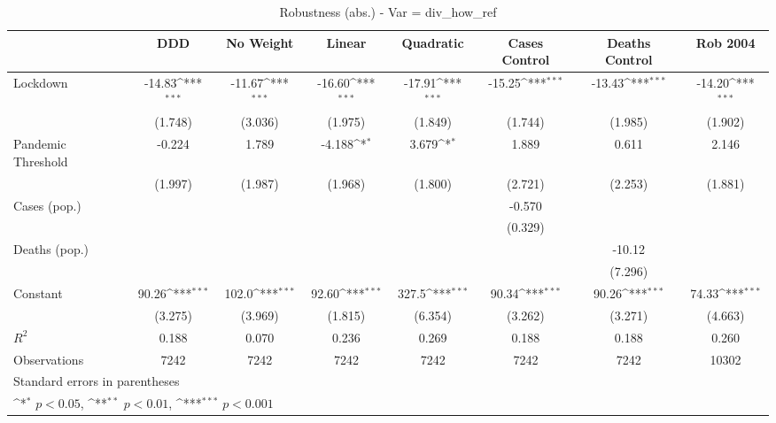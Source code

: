 \documentclass{article}
\begin{document}
{
\def\sym#1{\ifmmode^{#1}\else\(^{#1}\)\fi}
\begin{longtable}{l*{7}{c}}
\caption{Robustness (abs.) - Var = div\_how\_ref}\\
\hline\hline\endfirsthead\hline\endhead\hline\endfoot\endlastfoot
                &\multicolumn{1}{c}{DDD}&\multicolumn{1}{c}{No Weight}&\multicolumn{1}{c}{Linear}&\multicolumn{1}{c}{Quadratic}&\multicolumn{1}{c}{Cases Control}&\multicolumn{1}{c}{Deaths Control}&\multicolumn{1}{c}{Rob 2004}\\
\hline
Lockdown        &   -14.83\sym{***}&   -11.67\sym{***}&   -16.60\sym{***}&   -17.91\sym{***}&   -15.25\sym{***}&   -13.43\sym{***}&   -14.20\sym{***}\\
                &  (1.748)         &  (3.036)         &  (1.975)         &  (1.849)         &  (1.744)         &  (1.985)         &  (1.902)         \\
Pandemic Threshold&   -0.224         &    1.789         &   -4.188\sym{*}  &    3.679\sym{*}  &    1.889         &    0.611         &    2.146         \\
                &  (1.997)         &  (1.987)         &  (1.968)         &  (1.800)         &  (2.721)         &  (2.253)         &  (1.881)         \\
Cases (pop.)    &                  &                  &                  &                  &   -0.570         &                  &                  \\
                &                  &                  &                  &                  &  (0.329)         &                  &                  \\
Deaths (pop.)   &                  &                  &                  &                  &                  &   -10.12         &                  \\
                &                  &                  &                  &                  &                  &  (7.296)         &                  \\
Constant        &    90.26\sym{***}&    102.0\sym{***}&    92.60\sym{***}&    327.5\sym{***}&    90.34\sym{***}&    90.26\sym{***}&    74.33\sym{***}\\
                &  (3.275)         &  (3.969)         &  (1.815)         &  (6.354)         &  (3.262)         &  (3.271)         &  (4.663)         \\
\hline
\(R^{2}\)       &    0.188         &    0.070         &    0.236         &    0.269         &    0.188         &    0.188         &    0.260         \\
Observations    &     7242         &     7242         &     7242         &     7242         &     7242         &     7242         &    10302         \\
\hline\hline
\multicolumn{8}{l}{\footnotesize Standard errors in parentheses}\\
\multicolumn{8}{l}{\footnotesize \sym{*} \(p<0.05\), \sym{**} \(p<0.01\), \sym{***} \(p<0.001\)}\\
\end{longtable}
}
\end{document}
